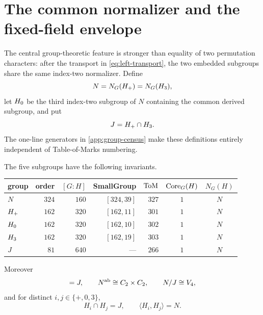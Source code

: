 \section{The common normalizer and the fixed-field envelope}
\label{sec:envelope}

The central group-theoretic feature is stronger than equality of two
permutation characters: after the transport in \eqref{eq:left-transport},
the two embedded subgroups share the same index-two normalizer.  Define
\begin{equation}
 N=N_G(H_{+})=N_G(H_{3}),
 \label{eq:def-N}
\end{equation}
let $H_{0}$ be the third index-two subgroup of $N$ containing the common
derived subgroup, and put
\begin{equation}
 J=H_{+}\cap H_{3}.
 \label{eq:def-J}
\end{equation}
The one-line generators in \cref{app:group-census} make these definitions
entirely independent of Table-of-Marks numbering.

\begin{proposition}
\label{prop:group-lattice}
The five subgroups have the following invariants.
\begin{center}
\begin{tabular}{@{}lrrrrcc@{}}
\toprule
group & order & $[G:H]$ & SmallGroup & $\operatorname{ToM}$ & $\operatorname{Core}_G(H)$ & $N_G(H)$\\
\midrule
$N$       & $324$ & $160$ & $[324,39]$ & $327$ & $1$ & $N$\\
$H_{+}$  & $162$ & $320$ & $[162,11]$ & $301$ & $1$ & $N$\\
$H_{0}$  & $162$ & $320$ & $[162,10]$ & $302$ & $1$ & $N$\\
$H_{3}$ & $162$ & $320$ & $[162,19]$ & $303$ & $1$ & $N$\\
$J$       & $81$  & $640$ & ---        & $266$ & $1$ & $N$\\
\bottomrule
\end{tabular}
\end{center}
Moreover
\begin{equation}
 [N,N]=J,\qquad N^{\mathrm{ab}}\cong C_2\times C_2,
 \qquad N/J\cong\Vfour,
 \label{eq:N-quotient}
\end{equation}
and for distinct $i,j\in\{+,0,3\}$,
\begin{equation}
 H_i\cap H_j=J,\qquad \langle H_i,H_j\rangle=N.
 \label{eq:meet-join}
\end{equation}
\end{proposition}


